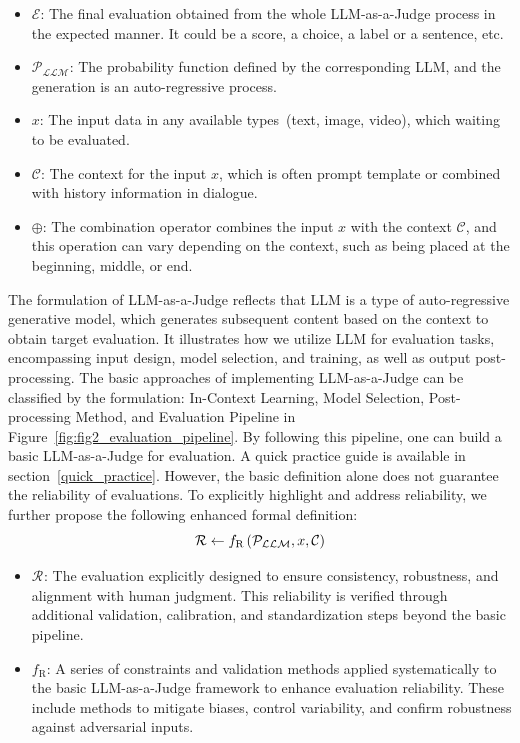 \begin{itemize}
    \item $\mathcal{E}$: The final evaluation obtained from the whole LLM-as-a-Judge process in the expected manner. It could be a score, a choice, a label or a sentence, etc.
    \item $\mathcal{P}_{\mathcal{LLM}}$: The probability function defined by the corresponding LLM, and the generation is an auto-regressive process.
    \item $x$: The input data in any available types~(text, image, video), which waiting to be evaluated.
    \item $\mathcal{C}$: The context for the input $x$, which is often prompt template or combined with history information in dialogue.
    \item $\oplus$: The combination operator combines the input $x$ with the context $\mathcal{C}$, and this operation can vary depending on the context, such as being placed at the beginning, middle, or end.
\end{itemize}

The formulation of LLM-as-a-Judge reflects that LLM is a type of auto-regressive generative model, which generates subsequent content based on the context to obtain target evaluation. It illustrates how we utilize LLM for evaluation tasks, encompassing input design, model selection, and training, as well as output post-processing. 
The basic approaches of implementing LLM-as-a-Judge can be classified by the formulation: In-Context Learning, Model Selection, Post-processing Method, and Evaluation Pipeline in Figure~\ref{fig:fig2_evaluation_pipeline}. By following this pipeline, one can build a basic LLM-as-a-Judge for evaluation. A quick practice guide is available in section~\ref{quick_practice}.
However, the basic definition alone does not guarantee the reliability of evaluations. To explicitly highlight and address reliability, we further propose the following enhanced formal definition:
\vspace{-2pt}
\[
\Large
\mathcal{R} \leftarrow f_{\text{R}}\left(\mathcal{P}_{\mathcal{LLM}}, x, \mathcal{C}\right)
\]
\vspace{-10pt}

\begin{itemize}
\item $\mathcal{R}_{\text{}}$: The evaluation explicitly designed to ensure consistency, robustness, and alignment with human judgment. This reliability is verified through additional validation, calibration, and standardization steps beyond the basic pipeline.
\item $f_{\text{R}}$: A series of constraints and validation methods applied systematically to the basic LLM-as-a-Judge framework to enhance evaluation reliability. These include methods to mitigate biases, control variability, and confirm robustness against adversarial inputs.
\end{itemize}





